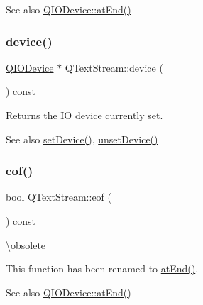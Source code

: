 \begin{DoxySeeAlso}{See also}
\mbox{\hyperlink{class_q_i_o_device_ac5a3fcc9349a98d8f260039c5fd58812}{Q\+I\+O\+Device\+::at\+End()}} 
\end{DoxySeeAlso}
\mbox{\label{class_q_text_stream_a50f5712b3231e41af256c5faadf69512}} 
\subsubsection{\texorpdfstring{device()}{device()}}
{\footnotesize\ttfamily \mbox{\hyperlink{class_q_i_o_device}{Q\+I\+O\+Device}} $\ast$ Q\+Text\+Stream\+::device (\begin{DoxyParamCaption}{ }\end{DoxyParamCaption}) const\hspace{0.3cm}{\ttfamily [inline]}}

Returns the IO device currently set. \begin{DoxySeeAlso}{See also}
\mbox{\hyperlink{class_q_text_stream_a20bb0f4064d19330d4ed6bb56299fba7}{set\+Device()}}, \mbox{\hyperlink{class_q_text_stream_a6d8aeebd7f4b1cc9f2dce27f6a0d9bd9}{unset\+Device()}} 
\end{DoxySeeAlso}
\mbox{\label{class_q_text_stream_ad872bf98aaeea64f9e0f45aaf2a59213}} 
\subsubsection{\texorpdfstring{eof()}{eof()}}
{\footnotesize\ttfamily bool Q\+Text\+Stream\+::eof (\begin{DoxyParamCaption}{ }\end{DoxyParamCaption}) const\hspace{0.3cm}{\ttfamily [inline]}}

\textbackslash{}obsolete

This function has been renamed to \mbox{\hyperlink{class_q_text_stream_a07ba00c9cec9d02ccb9bef9832932c9e}{at\+End()}}.

\begin{DoxySeeAlso}{See also}
\mbox{\hyperlink{class_q_i_o_device_ac5a3fcc9349a98d8f260039c5fd58812}{Q\+I\+O\+Device\+::at\+End()}} 
\end{DoxySeeAlso}
\mbox{\label{class_q_text_stream_a485699c07b1ea6104a84627876cc2cd9}} 
